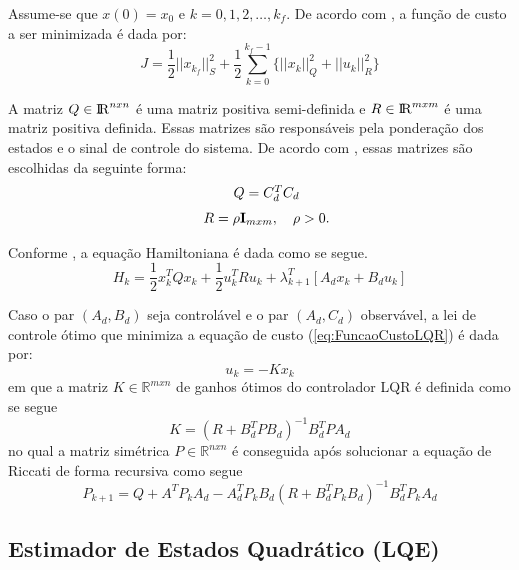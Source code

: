 Assume-se que $x(0) = x_0$ e $k = 0, 1, 2,\dots,k_f$. De acordo com \cite{Sage}, a função de custo a ser minimizada é dada por:
\begin{equation}\label{eq:FuncaoCustoLQR}
    J = \frac{1}{2}||x_{k_f}||^2_S + \frac{1}{2}\sum_{k=0}^{k_f-1} \{||x_k||^2_Q + ||u_k||^2_R\}
\end{equation}{}

A matriz $Q \in {\rm I\kern-.17em R}^{nxn}$ é uma matriz positiva semi-definida e $R \in {\rm I\kern-.17em R}^{mxm}$ é uma matriz positiva definida. Essas matrizes são responsáveis pela ponderação dos estados e o sinal de controle do sistema. De acordo com \cite{Matos:08}, essas matrizes são escolhidas da seguinte forma:
\begin{equation*}
    \begin{array}{cc}
         &  Q = C_d^TC_d\\[6pt]
         &  R = \rho {\bf I}_{mxm}, ~~~ \rho > 0.
    \end{array}{}
\end{equation*}{}

Conforme \cite{Sage}, a equação Hamiltoniana é dada como se segue.
\begin{equation}\label{eq:Hamiltoniana}
    H_k = \frac{1}{2}x_k^TQx_k + \frac{1}{2}u_k^TRu_k + \lambda_{k+1}^T[A_dx_k + B_du_k]
\end{equation}{}

Caso o par $(A_d,B_d)$ seja controlável e o par $(A_d,C_d)$ observável, a lei de controle ótimo que minimiza a equação de custo (\ref{eq:FuncaoCustoLQR}) é dada por:
\begin{equation}\label{eq:LeiControleLQR}
    u_k = -Kx_k
\end{equation}{}
em que a matriz $K \in \mathbb{R}^{mxn}$ de ganhos ótimos do controlador LQR é definida como se segue
\begin{equation}\label{eq:GanhoLQR}
    K = (R + B_d^TPB_d)^{-1}B_d^TPA_d
\end{equation}{}
no qual a matriz simétrica $P \in \mathbb{R}^{nxn}$ é conseguida após solucionar a equação de Riccati de forma recursiva como segue
\begin{equation}\label{eq:RiccatiLQR}
    P_{k+1} = Q + A^TP_kA_d - A_d^TP_kB_d(R + B_d^TP_kB_d)^{-1}B_d^TP_kA_d
\end{equation}{}

\subsection{Estimador de Estados Quadrático (LQE)}\label{sec:MetodologiaFiltroKalman}

